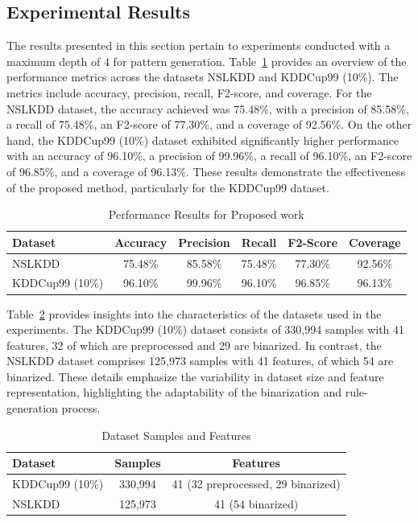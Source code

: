 \documentclass[pdflatex,sn-mathphys-num]{sn-jnl}%
\let\oldcaption\caption
\renewcommand{\caption}[1]{\oldcaption{\centering #1}}
\theoremstyle{thmstyleone}%
\theoremstyle{thmstyletwo}%
\theoremstyle{thmstylethree}%
\begin{document}
\subsection{Experimental Results}
The results presented in this section pertain to experiments conducted with a maximum depth of 4 for pattern generation.
Table~\ref{tab:4result} provides an overview of the performance metrics across the datasets NSLKDD and KDDCup99 (10\%).
The metrics include accuracy, precision, recall, F2-score, and coverage.
For the NSLKDD dataset, the accuracy achieved was 75.48\%, with a precision of 85.58\%, a recall of 75.48\%, an F2-score of 77.30\%, and a coverage of 92.56\%.
On the other hand, the KDDCup99 (10\%) dataset exhibited significantly higher performance with an accuracy of 96.10\%, a precision of 99.96\%, a recall of 96.10\%, an F2-score of 96.85\%, and a coverage of 96.13\%.
These results demonstrate the effectiveness of the proposed method, particularly for the KDDCup99 dataset.

\begin{table}[ht!]
  \centering
  \caption{Performance Results for Proposed work}
  \label{tab:4result}
  \begin{tabular}{lccccc}
    \hline
    \textbf{Dataset} & \textbf{Accuracy} & \textbf{Precision} & \textbf{Recall} & \textbf{F2-Score} & \textbf{Coverage} \\ \hline
    NSLKDD           & 75.48\%           & 85.58\%            & 75.48\%         & 77.30\%           & 92.56\%           \\
    KDDCup99 (10\%)  & 96.10\%           & 99.96\%            & 96.10\%         & 96.85\%           & 96.13\%           \\ \hline
  \end{tabular}
\end{table}


Table~\ref{tab:Dataset_Samples} provides insights into the characteristics of the datasets used in the experiments.
The KDDCup99 (10\%) dataset consists of 330,994 samples with 41 features, 32 of which are preprocessed and 29 are binarized.
In contrast, the NSLKDD dataset comprises 125,973 samples with 41 features, of which 54 are binarized.
These details emphasize the variability in dataset size and feature representation, highlighting the adaptability of the binarization and rule-generation process.

\begin{table}[ht!]
  \centering
  \caption{Dataset Samples and Features}
  \label{tab:Dataset_Samples}
  \begin{tabular}{lcc}
    \hline
    \textbf{Dataset} & \textbf{Samples} & \textbf{Features}                  \\ \hline
    KDDCup99 (10\%)  & 330,994          & 41 (32 preprocessed, 29 binarized) \\
    NSLKDD           & 125,973          & 41 (54 binarized)                  \\ \hline
  \end{tabular}
\end{table}
\end{document}

